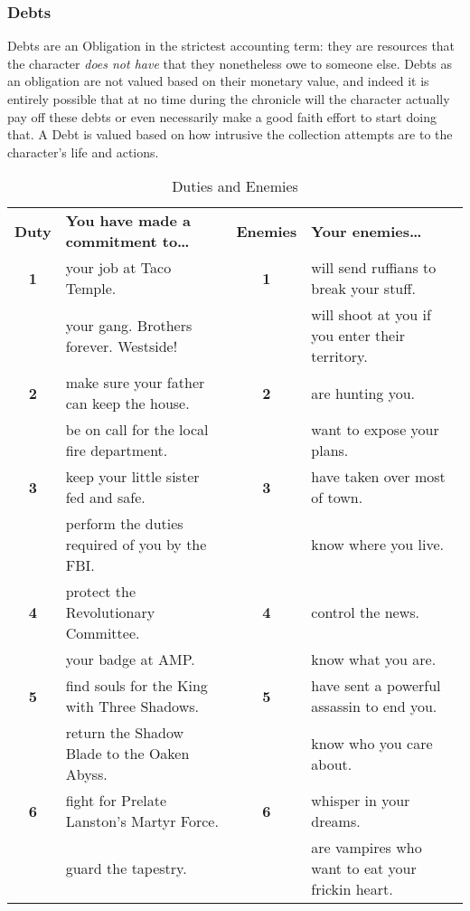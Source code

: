 \subsubsection{Debts}

\hspace{\parindent} Debts are an Obligation in the strictest accounting term: they are resources that the character \textit{does not have} that they nonetheless owe to someone else. Debts as an obligation are not valued based on their monetary value, and indeed it is entirely possible that at no time during the chronicle will the character actually pay off these debts or even necessarily make a good faith effort to start doing that. A Debt is valued based on how intrusive the collection attempts are to the character's life and actions.

\begin{table}[htb] \center
\caption{Duties and Enemies} 
\begin{tabular}{c p{6.75cm} c p{6.75cm}}
\textbf{Duty} & \textbf{You have made a commitment to\ldots{}}&\textbf{Enemies} & \textbf{Your enemies\ldots{}}\\
\textbf{1}  &   your job at Taco Temple.&\textbf{1}  &   will send ruffians to break your stuff.\\
& your gang. Brothers forever. Westside!& &will shoot at you if you enter their territory.\\
\textbf{2}  &   make sure your father can keep the house.&\textbf{2}  &   are hunting you.\\
& be on call for the local fire department.& &want to expose your plans.\\
\textbf{3}  &   keep your little sister fed and safe.&\textbf{3}  &   have taken over most of town.\\
 &perform the duties required of you by the FBI.& &know where you live.\\
\textbf{4}  &   protect the Revolutionary Committee.&\textbf{4}  &   control the news.\\
 &your badge at AMP.& &know what you are.\\
\textbf{5}  &   find souls for the King with Three Shadows.&\textbf{5}  &   have sent a powerful assassin to end you.\\
 &return the Shadow Blade to the Oaken Abyss.& &know who you care about.\\
\textbf{6}  &   fight for Prelate Lanston's Martyr Force.&\textbf{6}  &   whisper in your dreams.\\
& guard the tapestry.&& are vampires who want to eat your frickin heart.\\
\end{tabular}
\end{table}

